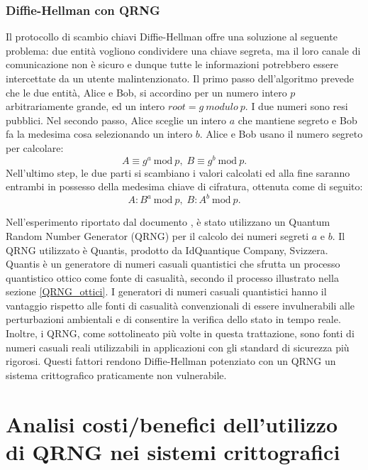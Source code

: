 \subsubsection{Diffie-Hellman con QRNG}
Il protocollo di scambio chiavi Diffie-Hellman offre una soluzione al seguente problema: due entità vogliono condividere una chiave segreta, ma il loro canale di comunicazione non è sicuro e dunque tutte le informazioni potrebbero essere intercettate da un utente malintenzionato. Il primo passo dell'algoritmo prevede che le due entità, Alice e Bob, si accordino per un numero intero $p$ arbitrariamente grande, ed un intero $root = g \: modulo \: p$. I due numeri sono resi pubblici. Nel secondo passo, Alice sceglie un intero $a$ che mantiene segreto e Bob fa la medesima cosa selezionando un intero $b$. Alice e Bob usano il numero segreto per calcolare: 
\begin{equation}
    A \equiv g^{a} \: \mathrm{mod} \: p, \; B \equiv g^b \: \mathrm{mod} \: p.
\end{equation}
Nell'ultimo step, le due parti si scambiano i valori calcolati ed alla fine saranno entrambi in possesso della medesima chiave di cifratura, ottenuta come di seguito: 
\begin{equation}
    A : B^a \: \mathrm{mod} \: p, \; B: A^b \: \mathrm{mod} \: p.
\end{equation}

Nell'esperimento riportato dal documento \cite{mogos_use_2016}, è stato utilizzano un Quantum Random Number Generator (QRNG) per il calcolo dei numeri segreti $a$ e $b$. Il QRNG utilizzato è Quantis, prodotto da IdQuantique Company, Svizzera. Quantis è un generatore di numeri casuali quantistici che sfrutta un processo quantistico ottico come fonte di casualità, secondo il processo illustrato nella sezione \ref{QRNG_ottici}. 
I generatori di numeri casuali quantistici hanno il vantaggio rispetto alle fonti di casualità convenzionali di essere invulnerabili alle perturbazioni ambientali e di consentire la verifica dello stato in tempo reale. Inoltre, i QRNG, come sottolineato più volte in questa trattazione, sono fonti di numeri casuali reali utilizzabili in applicazioni con gli standard di sicurezza più rigorosi. Questi fattori rendono Diffie-Hellman potenziato con un QRNG un sistema crittografico praticamente non vulnerabile.  

\section{Analisi costi/benefici dell'utilizzo di QRNG nei sistemi crittografici}
